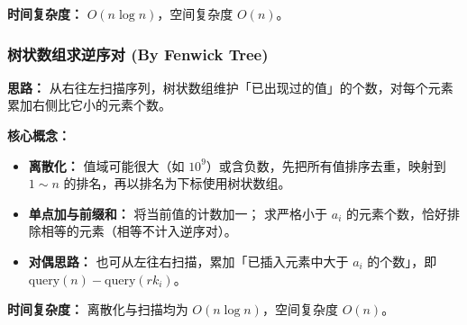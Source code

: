 \textbf{时间复杂度：} $O(n \log n)$，空间复杂度 $O(n)$。



\subsubsection{树状数组求逆序对 (By Fenwick Tree)}

\textbf{思路：}
从右往左扫描序列，树状数组维护「已出现过的值」的个数，对每个元素累加右侧比它小的元素个数。

\textbf{核心概念：}
\begin{itemize}
  \item \textbf{离散化：} 值域可能很大（如 $10^9$）或含负数，先把所有值排序去重，映射到 $1 \sim n$ 的排名，再以排名为下标使用树状数组。
  \item \textbf{单点加与前缀和：}  将当前值的计数加一； 求严格小于 $a_i$ 的元素个数，恰好排除相等的元素（相等不计入逆序对）。
  \item \textbf{对偶思路：} 也可从左往右扫描，累加「已插入元素中大于 $a_i$ 的个数」，即 $\text{query}(n) - \text{query}(rk_i)$。
\end{itemize}

\textbf{时间复杂度：} 离散化与扫描均为 $O(n \log n)$，空间复杂度 $O(n)$。


